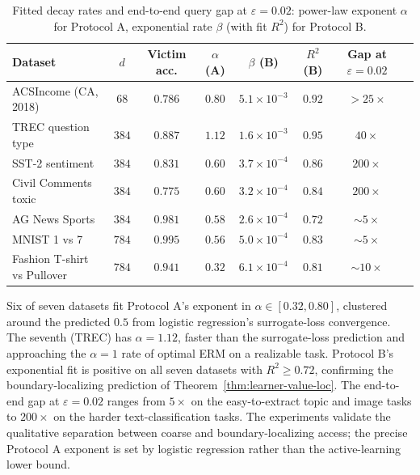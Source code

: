 \documentclass[runningheads,envcountsame]{llncs}
\newcommand{\eps}{\varepsilon}
\begin{document}
\begin{table}[t]
\centering
\caption{Fitted decay rates and end-to-end query gap at $\eps = 0.02$: power-law exponent $\alpha$ for Protocol A, exponential rate $\beta$ (with fit $R^2$) for Protocol B.}
\label{tab:rates}
\setlength{\tabcolsep}{3pt}
\scriptsize
\begin{tabular}{lccccccc}
\toprule
Dataset & $d$ & Victim acc. & $\alpha$ (A) & $\beta$ (B) & $R^2$ (B) & Gap at $\eps{=}0.02$ \\
\midrule
ACSIncome (CA, 2018)        & $68$  & $0.786$ & $0.80$ & $5.1 \times 10^{-3}$ & $0.92$ & ${>}25\times$ \\
TREC question type          & $384$ & $0.887$ & $1.12$ & $1.6 \times 10^{-3}$ & $0.95$ & $40\times$ \\
SST-2 sentiment             & $384$ & $0.831$ & $0.60$ & $3.7 \times 10^{-4}$ & $0.86$ & $200\times$ \\
Civil Comments toxic        & $384$ & $0.775$ & $0.60$ & $3.2 \times 10^{-4}$ & $0.84$ & $200\times$ \\
AG News Sports              & $384$ & $0.981$ & $0.58$ & $2.6 \times 10^{-4}$ & $0.72$ & ${\sim}5\times$ \\
MNIST 1 vs 7                & $784$ & $0.995$ & $0.56$ & $5.0 \times 10^{-4}$ & $0.83$ & ${\sim}5\times$ \\
Fashion T-shirt vs Pullover & $784$ & $0.941$ & $0.32$ & $6.1 \times 10^{-4}$ & $0.81$ & ${\sim}10\times$ \\
\bottomrule
\end{tabular}
\end{table}

Six of seven datasets fit Protocol A's exponent in $\alpha \in [0.32, 0.80]$, clustered around the predicted $0.5$ from logistic regression's surrogate-loss convergence. The seventh (TREC) has $\alpha = 1.12$, faster than the surrogate-loss prediction and approaching the $\alpha = 1$ rate of optimal ERM on a realizable task. Protocol B's exponential fit is positive on all seven datasets with $R^2 \geq 0.72$, confirming the boundary-localizing prediction of Theorem~\ref{thm:learner-value-loc}. The end-to-end gap at $\eps = 0.02$ ranges from $5\times$ on the easy-to-extract topic and image tasks to $200\times$ on the harder text-classification tasks. The experiments validate the qualitative separation between coarse and boundary-localizing access; the precise Protocol A exponent is set by logistic regression rather than the active-learning lower bound.
\end{document}
